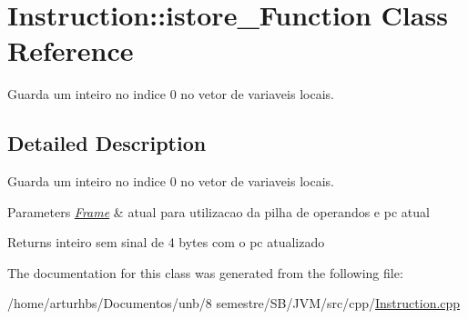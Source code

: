 \hypertarget{classInstruction_1_1istore__0Function}{}\section{Instruction\+:\+:istore\+\_\+Function Class Reference}
\label{classInstruction_1_1istore__0Function}


Guarda um inteiro no indice 0 no vetor de variaveis locais.  




\subsection{Detailed Description}
Guarda um inteiro no indice 0 no vetor de variaveis locais. 


\begin{DoxyParams}{Parameters}
{\em \hyperlink{classFrame}{Frame}} & atual para utilizacao da pilha de operandos e pc atual \\
\hline
\end{DoxyParams}
\begin{DoxyReturn}{Returns}
inteiro sem sinal de 4 bytes com o pc atualizado 
\end{DoxyReturn}


The documentation for this class was generated from the following file\+:\begin{DoxyCompactItemize}
\item 
/home/arturhbs/\+Documentos/unb/8 semestre/\+S\+B/\+J\+V\+M/src/cpp/\hyperlink{Instruction_8cpp}{Instruction.\+cpp}\end{DoxyCompactItemize}
